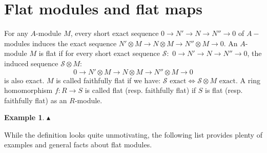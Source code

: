 \documentclass[12pt]{article}
\theoremstyle{mytheoremstyle}
\newtheorem{example}{Example}
\begin{document}
\section{Flat modules and flat maps}

\hspace*{8mm}For any $A$-module $M$, every short exact sequence
$0\longrightarrow N'\longrightarrow N\longrightarrow N''
    \longrightarrow 0$ of $A-$ modules induces the exact sequence
$ N'\otimes M\longrightarrow N\otimes M
    \longrightarrow N''\otimes M\longrightarrow 0$.
An $A$-module $M$ is flat if for every short exact sequence
$\mathcal{S}:$
$0\longrightarrow N'\longrightarrow N\longrightarrow N''
    \longrightarrow 0$, the induced sequence $\mathcal{S}\otimes M:$
$$0\longrightarrow N'\otimes M\longrightarrow N\otimes M
    \longrightarrow N''\otimes M\longrightarrow 0$$
is also exact. $M$ is called faithfully flat if we have:
$\mathcal{S}\text{ exact}\iff \mathcal{S}\otimes M \text{ exact}.$
A ring homomorphism $f\colon R \to S$ is called flat (resp. faithfully flat)
if $S$ is flat (resp. faithfully flat) as
an $R$-module.

\begin{example}
    $\blacktriangle$
\end{example}


While the definition looks quite unmotivating,
the following list provides plenty of examples and general
facts about flat modules.
\end{document}
